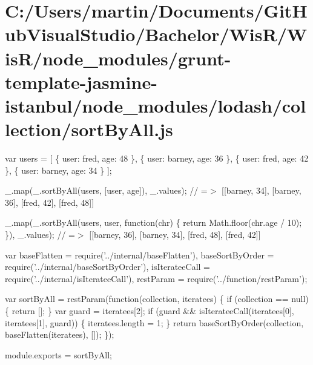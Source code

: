 \hypertarget{_c_1_2_users_2martin_2_documents_2_git_hub_visual_studio_2_bachelor_2_wis_r_2_wis_r_2node_module60ff26414b8225853900c9c1fc31c101}{}\section{C\+:/\+Users/martin/\+Documents/\+Git\+Hub\+Visual\+Studio/\+Bachelor/\+Wis\+R/\+Wis\+R/node\+\_\+modules/grunt-\/template-\/jasmine-\/istanbul/node\+\_\+modules/lodash/collection/sort\+By\+All.\+js}
var users = \mbox{[} \{ \textquotesingle{}user\textquotesingle{}\+: \textquotesingle{}fred\textquotesingle{}, \textquotesingle{}age\textquotesingle{}\+: 48 \}, \{ \textquotesingle{}user\textquotesingle{}\+: \textquotesingle{}barney\textquotesingle{}, \textquotesingle{}age\textquotesingle{}\+: 36 \}, \{ \textquotesingle{}user\textquotesingle{}\+: \textquotesingle{}fred\textquotesingle{}, \textquotesingle{}age\textquotesingle{}\+: 42 \}, \{ \textquotesingle{}user\textquotesingle{}\+: \textquotesingle{}barney\textquotesingle{}, \textquotesingle{}age\textquotesingle{}\+: 34 \} \mbox{]};

\+\_\+.\+map(\+\_\+.\+sort\+By\+All(users, \mbox{[}\textquotesingle{}user\textquotesingle{}, \textquotesingle{}age\textquotesingle{}\mbox{]}), \+\_\+.\+values); // =$>$ \mbox{[}\mbox{[}\textquotesingle{}barney\textquotesingle{}, 34\mbox{]}, \mbox{[}\textquotesingle{}barney\textquotesingle{}, 36\mbox{]}, \mbox{[}\textquotesingle{}fred\textquotesingle{}, 42\mbox{]}, \mbox{[}\textquotesingle{}fred\textquotesingle{}, 48\mbox{]}\mbox{]}

\+\_\+.\+map(\+\_\+.\+sort\+By\+All(users, \textquotesingle{}user\textquotesingle{}, function(chr) \{ return Math.\+floor(chr.\+age / 10); \}), \+\_\+.\+values); // =$>$ \mbox{[}\mbox{[}\textquotesingle{}barney\textquotesingle{}, 36\mbox{]}, \mbox{[}\textquotesingle{}barney\textquotesingle{}, 34\mbox{]}, \mbox{[}\textquotesingle{}fred\textquotesingle{}, 48\mbox{]}, \mbox{[}\textquotesingle{}fred\textquotesingle{}, 42\mbox{]}\mbox{]}


\begin{DoxyCodeInclude}
var baseFlatten = require(\textcolor{stringliteral}{'../internal/baseFlatten'}),
    baseSortByOrder = require(\textcolor{stringliteral}{'../internal/baseSortByOrder'}),
    isIterateeCall = require(\textcolor{stringliteral}{'../internal/isIterateeCall'}),
    restParam = require(\textcolor{stringliteral}{'../function/restParam'});

var sortByAll = restParam(\textcolor{keyword}{function}(collection, iteratees) \{
  \textcolor{keywordflow}{if} (collection == null) \{
    \textcolor{keywordflow}{return} [];
  \}
  var guard = iteratees[2];
  \textcolor{keywordflow}{if} (guard && isIterateeCall(iteratees[0], iteratees[1], guard)) \{
    iteratees.length = 1;
  \}
  \textcolor{keywordflow}{return} baseSortByOrder(collection, baseFlatten(iteratees), []);
\});

module.exports = sortByAll;
\end{DoxyCodeInclude}
 